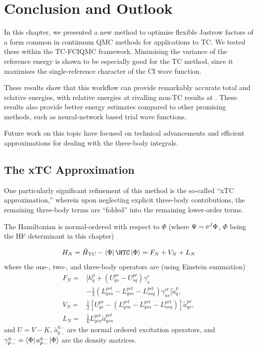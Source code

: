 \section{Conclusion and Outlook}

In this chapter, we presented a new method to optimise flexible Jastrow factors of a form common in continuum QMC methods for applications to TC. We tested these within the TC-FCIQMC framework. Minimising the variance of the reference energy is shown to be especially good for the TC method, since it maximises the single-reference character of the CI wave function.

These results show that this workflow can provide remarkably accurate total and relative energies, with relative energies at \vtz rivalling non-TC results at . These results also provide better energy estimates compared to other promising methods, such as neural-network based trial wave functions.

Future work on this topic have focused on technical advancements and efficient approximations for dealing with the three-body integrals.

\subsection{The xTC Approximation}

One particularly significant refinement of this method is the so-called ``xTC approximation,''\supercite{christlmaierXTC2023} wherein upon neglecting explicit three-body contributions, the remaining three-body terms are ``folded'' into the remaining lower-order terms.

The Hamiltonian is normal-ordered with respect to $\Phi$ (where $\Psi=\mathrm{e}^J\Phi$, $\Phi$ being the HF determinant in this chapter)

\begin{equation}
    H_N = \htc - \bra{\Phi}\HTC\ket\Phi = F_N + V_N + L_N
\end{equation}
where the one-, two-, and three-body operators are (using Einstein summation)
\begin{align}
F_N =& [h_q^p + (U_{qs}^{pr}-U_{sq}^{pr})\gamma_s^r \\
&- \frac 12 (L_{qsu}^{prt} - L_{qus}^{prt}-L_{usq}^{prt})\gamma_{us}^{rt}]
\tilde a_q^p, \\
V_N =& \frac 12[U_{qs}^{pr} - (L_{qsu}^{prt} - L_{qus}^{prt}-L_{usq}^{prt})]\tilde a_{qs}^{pr}, \\
L_N =& \frac 16L_{qsu}^{prt}\tilde a_{qsu}^{prt}
\end{align}
and $U=V-K$, $\tilde a_{p\dots}^{q\dots}$ are the normal ordered
excitation operators, and $\gamma_{p\dots}^{q\dots}=\bra\Phi a_{p\dots}^{q\dots}\ket\Phi$ are the density matrices.

